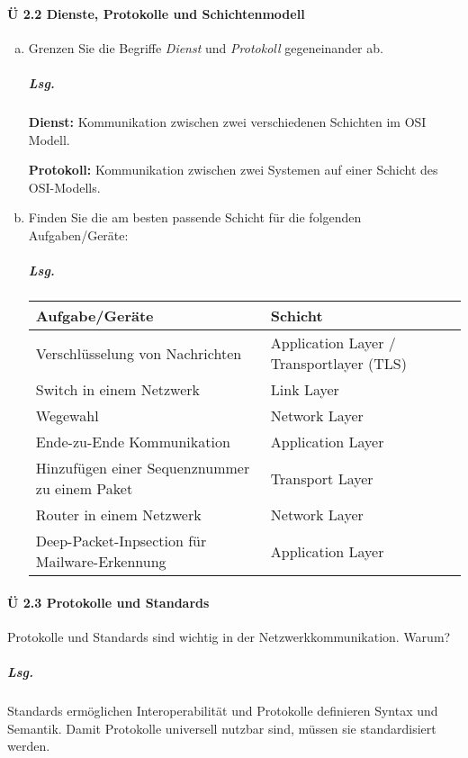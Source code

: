 \documentclass{scrreprt}
\begin{document}
\paragraph{Ü 2.2 Dienste, Protokolle und Schichtenmodell}
\begin{enumerate}[(a)]
\item Grenzen Sie die Begriffe \emph{Dienst} und \emph{Protokoll} gegeneinander ab.

  \subparagraph{Lsg.} \textbf{Dienst:} Kommunikation zwischen zwei verschiedenen
  Schichten im OSI Modell.

  \textbf{Protokoll:} Kommunikation zwischen zwei Systemen auf einer Schicht
  des OSI-Modells.
\setcounter{enumi}{2}
\item Finden Sie die am besten passende Schicht für die folgenden
  Aufgaben/Geräte:

  \subparagraph{Lsg. } \phantom{\null}

  \begin{tabular}{l|l}
    \textbf{Aufgabe/Geräte} & \textbf{Schicht} \\
    \hline
    Verschlüsselung von Nachrichten & Application Layer / Transportlayer (TLS) \\
    Switch in einem Netzwerk & Link Layer \\
    Wegewahl & Network Layer \\
    Ende-zu-Ende Kommunikation & Application Layer \\
    Hinzufügen einer Sequenznummer zu einem Paket & Transport Layer \\
    Router in einem Netzwerk & Network Layer \\
    Deep-Packet-Inpsection für Mailware-Erkennung & Application Layer \\
  \end{tabular}
\end{enumerate}

\newpage
\paragraph{Ü 2.3 Protokolle und Standards}

Protokolle und Standards sind wichtig in der Netzwerkkommunikation.
Warum?


\subparagraph{Lsg.} Standards ermöglichen Interoperabilität und Protokolle
definieren Syntax und Semantik.
Damit Protokolle universell nutzbar sind, müssen sie standardisiert werden.
\end{document}
